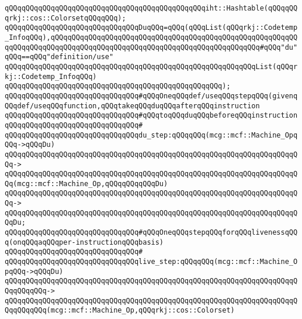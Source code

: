 \verb|qQQqqQQqqQQqqQQqqQQqqQQqqQQqqQQqqQQqqQQqqQQqqQQqiht::Hashtable(qQQqqQQqrkj::cos::ColorsetqQQqqQQq);|\newline
\newline
\verb|qQQqqQQqqQQqqQQqqQQqqQQqqQQqqQQqDuqQQq=qQQq(qQQqList(qQQqrkj::Codetemp_InfoqQQq),qQQqqQQqqQQqqQQqqQQqqQQqqQQqqQQqqQQqqQQqqQQqqQQqqQQqqQQqqQQqqQQqqQQqqQQqqQQqqQQqqQQqqQQqqQQqqQQqqQQqqQQqqQQqqQQqqQQqqQQq#qQQq"du"qQQq==qQQq"definition/use"|\newline
\verb|qQQqqQQqqQQqqQQqqQQqqQQqqQQqqQQqqQQqqQQqqQQqqQQqqQQqqQQqqQQqList(qQQqrkj::Codetemp_InfoqQQq)|\newline
\verb|qQQqqQQqqQQqqQQqqQQqqQQqqQQqqQQqqQQqqQQqqQQqqQQqqQQq);|\newline
\newline
\verb|qQQqqQQqqQQqqQQqqQQqqQQqqQQqqQQq#qQQqOneqQQqdef/useqQQqstepqQQq(givenqQQqdef/useqQQqfunction,qQQqtakeqQQqduqQQqafterqQQqinstruction|\newline
\verb|qQQqqQQqqQQqqQQqqQQqqQQqqQQqqQQq#qQQqtoqQQqduqQQqbeforeqQQqinstruction|\newline
\verb|qQQqqQQqqQQqqQQqqQQqqQQqqQQqqQQq#|\newline
\verb|qQQqqQQqqQQqqQQqqQQqqQQqqQQqqQQqdu_step:qQQqqQQq(mcg::mcf::Machine_OpqQQq->qQQqDu)|\newline
\verb|qQQqqQQqqQQqqQQqqQQqqQQqqQQqqQQqqQQqqQQqqQQqqQQqqQQqqQQqqQQqqQQqqQQqqQQq->|\newline
\verb|qQQqqQQqqQQqqQQqqQQqqQQqqQQqqQQqqQQqqQQqqQQqqQQqqQQqqQQqqQQqqQQqqQQqqQQq(mcg::mcf::Machine_Op,qQQqqQQqqQQqDu)|\newline
\verb|qQQqqQQqqQQqqQQqqQQqqQQqqQQqqQQqqQQqqQQqqQQqqQQqqQQqqQQqqQQqqQQqqQQqqQQq->|\newline
\verb|qQQqqQQqqQQqqQQqqQQqqQQqqQQqqQQqqQQqqQQqqQQqqQQqqQQqqQQqqQQqqQQqqQQqqQQqDu;|\newline
\newline
\verb|qQQqqQQqqQQqqQQqqQQqqQQqqQQqqQQq#qQQqOneqQQqstepqQQqforqQQqlivenessqQQq(onqQQqaqQQqper-instructionqQQqbasis)|\newline
\verb|qQQqqQQqqQQqqQQqqQQqqQQqqQQqqQQq#|\newline
\verb|qQQqqQQqqQQqqQQqqQQqqQQqqQQqqQQqlive_step:qQQqqQQq(mcg::mcf::Machine_OpqQQq->qQQqDu)|\newline
\verb|qQQqqQQqqQQqqQQqqQQqqQQqqQQqqQQqqQQqqQQqqQQqqQQqqQQqqQQqqQQqqQQqqQQqqQQqqQQqqQQq->|\newline
\verb|qQQqqQQqqQQqqQQqqQQqqQQqqQQqqQQqqQQqqQQqqQQqqQQqqQQqqQQqqQQqqQQqqQQqqQQqqQQqqQQq(mcg::mcf::Machine_Op,qQQqrkj::cos::Colorset)|\newline
